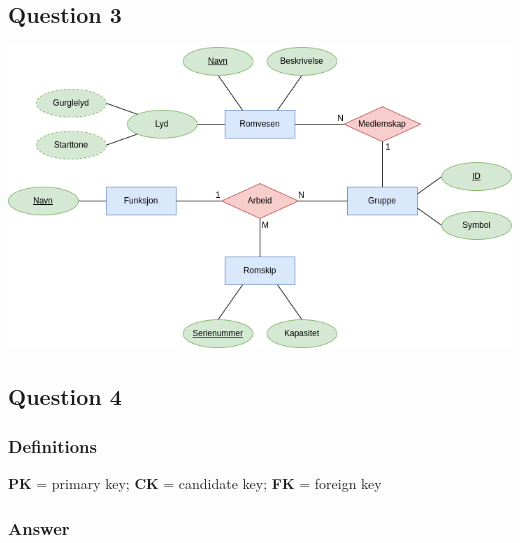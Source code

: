 \documentclass[]{article}
\begin{document}
\subsection*{Question 3}
\includegraphics[width=\textwidth]{figures/fig_q3.png}


\subsection*{Question 4}

\subsubsection*{Definitions}

\textbf{PK} = primary key; \textbf{CK} = candidate key; \textbf{FK} = foreign key

\subsubsection*{Answer}
\end{document}
